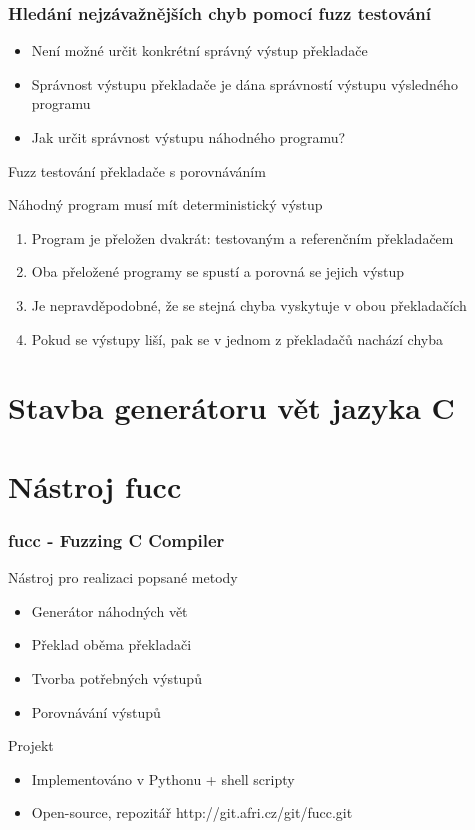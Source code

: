 \documentclass{beamer}
\begin{document}
\frame
{
  \frametitle{Hledání nejzávažnějších chyb pomocí fuzz testování}
  \begin{block}{ }
  \begin{itemize}
  \item Není možné určit konkrétní správný výstup překladače
  \item Správnost výstupu překladače je dána správností výstupu výsledného programu
  \item Jak určit správnost výstupu náhodného programu?
  \end{itemize}
  \end{block}
  \begin{block}{Fuzz testování překladače s porovnáváním}
  
  Náhodný program musí mít deterministický výstup
  \scriptsize{
  \begin{enumerate}
    \item Program je přeložen dvakrát: testovaným a referenčním překladačem
    \item Oba přeložené programy se spustí a porovná se jejich výstup
    \item Je nepravděpodobné, že se stejná chyba vyskytuje v obou překladačích
    \item Pokud se výstupy liší, pak se v jednom z překladačů nachází chyba
    \end{enumerate}
  }
  \end{block}
}

\section{Stavba generátoru vět jazyka C}
\frame
{
}


\section{Nástroj fucc}
\frame
{
\frametitle{fucc - Fuzzing C Compiler}
  \begin{block}{Nástroj pro realizaci popsané metody}
  \begin{itemize}
    \item Generátor náhodných vět 
    \item Překlad oběma překladači
    \item Tvorba potřebných výstupů
    \item Porovnávání výstupů
  \end{itemize}
  \end{block}

  \begin{block}{Projekt}
  \begin{itemize}
    \item Implementováno v Pythonu + shell scripty
    \item Open-source, repozitář http://git.afri.cz/git/fucc.git
  \end{itemize}
  \end{block} 
}
\end{document}
